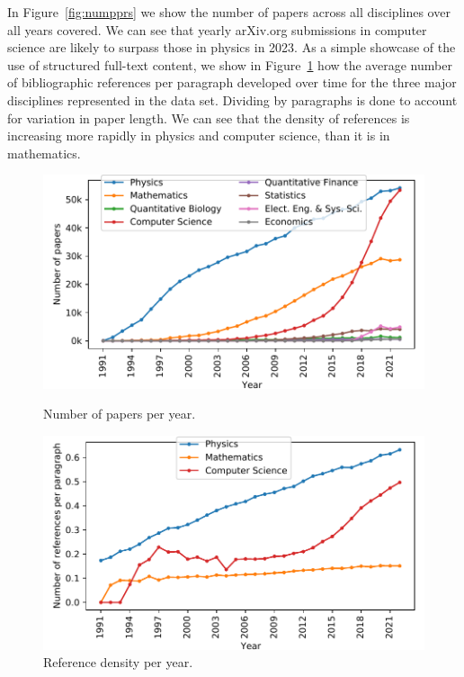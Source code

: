 In Figure~\ref{fig:numpprs} we show the number of papers across all disciplines over all years covered. We can see that yearly arXiv.org submissions in computer science are likely to surpass those in physics in 2023. As a simple showcase of the use of structured full-text content, we show in Figure~\ref{fig:refdensity} how the average number of bibliographic references per paragraph developed over time for the three major disciplines represented in the data set. Dividing by paragraphs is done to account for variation in paper length. We can see that the density of references is increasing more rapidly in physics and computer science, than it is in mathematics.

\begin{figure}
  \centering
  \includegraphics[width=\linewidth]{figures/ref_covgran/numpprs}
  \caption{Number of papers per year.}
  \label{fig:numpprs}

  \includegraphics[width=\linewidth]{figures/ref_covgran/refdensity}
  \caption{Reference density per year.}
  \label{fig:refdensity}
\end{figure}

